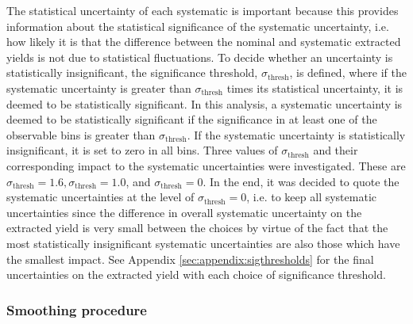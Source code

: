 The statistical uncertainty of each systematic is important because this provides information about the statistical significance of the systematic uncertainty, i.e. how likely it is that the difference between the nominal and systematic extracted yields is not due to statistical fluctuations. To decide whether an uncertainty is statistically insignificant, the significance threshold, $\sigma_{\text{thresh}}$, is defined, where if the systematic uncertainty is greater than $\sigma_{\text{thresh}}$ times its statistical uncertainty, it is deemed to be statistically significant. In this analysis, a systematic uncertainty is deemed to be statistically significant if the significance in at least one of the observable bins is greater than $\sigma_{\text{thresh}}$. If the systematic uncertainty is statistically insignificant, it is set to zero in all bins. Three values of $\sigma_{\text{thresh}}$ and their corresponding impact to the systematic uncertainties were investigated. These are $\sigma_{\text{thresh}} = 1.6, \sigma_{\text{thresh}} = 1.0$, and $\sigma_{\text{thresh}} = 0$. In the end, it was decided to quote the systematic uncertainties at the level of $\sigma_{\text{thresh}} = 0$, i.e. to keep all systematic uncertainties since the difference in overall systematic uncertainty on the extracted yield is very small between the choices by virtue of the fact that the most statistically insignificant systematic uncertainties are also those which have the smallest impact. See Appendix \ref{sec:appendix:sigthresholds} for the final uncertainties on the extracted yield with each choice of significance threshold. %

\subsubsection{Smoothing procedure}

